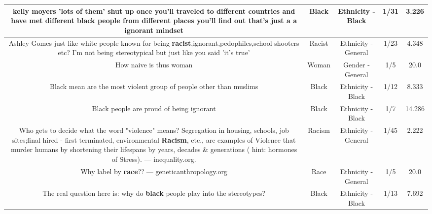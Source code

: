 \documentclass[11pt]{article}
\newlength\mylength
\begin{document}
\begin{center}
\begin{longtable}{|C{.65\mylength}|C{.30\mylength}|C{.12\mylength}|C{.12\mylength}|C{.12\mylength}|}
  \small kelly moyers  'lots of them' shut up once you'll traveled to different countries and have met different \textbf{black} people from different places you'll find out that's just a a ignorant mindset\normalsize   & Black & Ethnicity - Black & 1/31 & 3.226 \\  \hline
  \small Ashley Gomes  just like white people known for being \textbf{racist},ignorant,pedophiles,school shooters etc? I'm not being stereotypical but just like you said 'it's true'\normalsize   & Racist & Ethnicity - General & 1/23 & 4.348 \\  \hline
  \small How naive is thus woman\normalsize   & Woman & Gender - General & 1/5 & 20.0 \\  \hline
  \small Black mean are the most violent group of people other than muslims\normalsize   & Black & Ethnicity - Black & 1/12 & 8.333 \\  \hline
  \small Black people are proud of being ignorant\normalsize   & Black & Ethnicity - Black & 1/7 & 14.286 \\  \hline
  \small Who gets to decide what the word "violence" means? Segregation in housing, schools, job sites;final hired - first terminated,  environmental \textbf{Racism}, etc.,  are examples of Violence that murder humans by shortening their lifespans by years, decades \& generations ( hint: hormones of Stress). --- inequality.org.\normalsize   & Racism & Ethnicity - General & 1/45 & 2.222 \\  \hline
  \small Why label by \textbf{race}??🤔--- geneticanthropology.org\normalsize   & Race & Ethnicity - General & 1/5 & 20.0 \\  \hline
  \small The real question here is: why do \textbf{black} people play into the stereotypes?\normalsize   & Black & Ethnicity - Black & 1/13 & 7.692 \\  \hline

\end{longtable}
\end{center}
\end{document}
